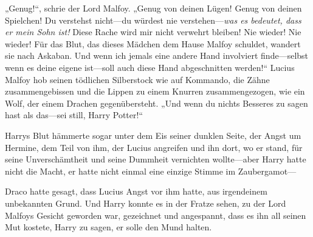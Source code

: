 „Genug!“, schrie der Lord Malfoy. „Genug von deinen Lügen! Genug von deinen Spielchen! Du verstehst nicht—du würdest nie verstehen—\emph{was es bedeutet, dass er mein Sohn ist!} Diese Rache wird mir nicht verwehrt bleiben! Nie wieder! Nie wieder! Für das Blut, das dieses Mädchen dem Hause Malfoy schuldet, wandert sie nach Askaban. Und wenn ich jemals eine andere Hand involviert finde—selbst wenn es deine eigene ist—soll auch diese Hand abgeschnitten werden!“
Lucius Malfoy hob seinen tödlichen Silberstock wie auf Kommando, die Zähne zusammengebissen und die Lippen zu einem Knurren zusammengezogen, wie ein Wolf, der einem Drachen gegenübersteht.
„Und wenn du nichts Besseres zu sagen hast als das—sei still, Harry Potter!“

\later

Harrys Blut hämmerte sogar unter dem Eis seiner dunklen Seite, der Angst um Hermine, dem Teil von ihm, der Lucius angreifen und ihn dort, wo er stand, für seine Unverschämtheit und seine Dummheit vernichten wollte—aber Harry hatte nicht die Macht, er hatte nicht einmal eine einzige Stimme im Zaubergamot—

Draco hatte gesagt, dass Lucius Angst vor ihm hatte, aus irgendeinem unbekannten Grund. Und Harry konnte es in der Fratze sehen, zu der Lord Malfoys Gesicht geworden war, gezeichnet und angespannt, dass es ihn all seinen Mut kostete, Harry zu sagen, er solle den Mund halten.

